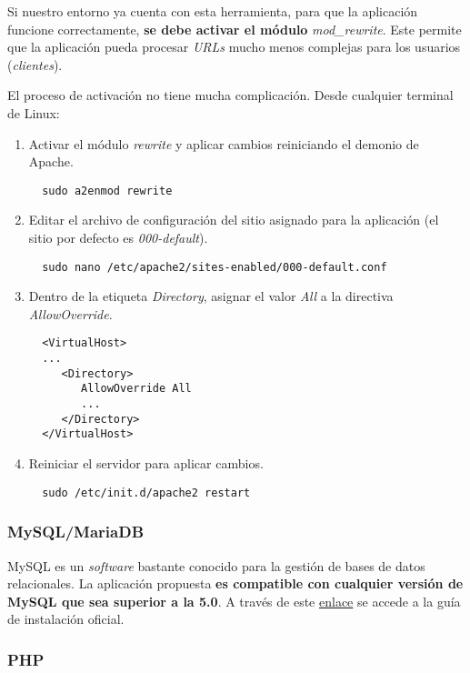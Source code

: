 Si nuestro entorno ya cuenta con esta herramienta, para que la
aplicación funcione correctamente, \textbf{se debe activar el módulo}
\emph{mod\_rewrite}. Este permite que la aplicación pueda procesar
\emph{URLs} mucho menos complejas para los usuarios (\emph{clientes}).

El proceso de activación no tiene mucha complicación. Desde cualquier
terminal de Linux:

\begin{enumerate}
\def\labelenumi{\arabic{enumi}.}
\tightlist
\item
  Activar el módulo \emph{rewrite} y aplicar cambios reiniciando el
  demonio de Apache.
  \begin{verbatim}
  sudo a2enmod rewrite
  \end{verbatim}
\item
  Editar el archivo de configuración del sitio asignado para la
  aplicación (el sitio por defecto es \emph{000-default}).
  \begin{verbatim}
  sudo nano /etc/apache2/sites-enabled/000-default.conf
  \end{verbatim}
\item
  Dentro de la etiqueta \emph{Directory}, asignar el valor \emph{All} a
  la directiva \emph{AllowOverride}.
  \begin{verbatim}
  <VirtualHost>
  ...
     <Directory>
        AllowOverride All
        ...
     </Directory>
  </VirtualHost>
  \end{verbatim}
\item Reiniciar el servidor para aplicar cambios.
  \begin{verbatim}
  sudo /etc/init.d/apache2 restart
  \end{verbatim}  
\end{enumerate}

\subsubsection{MySQL/MariaDB}

MySQL es un \emph{software} bastante conocido para la gestión de bases
de datos relacionales. La aplicación propuesta \textbf{es compatible con
cualquier versión de MySQL que sea superior a la 5.0}. A través de este
\href{https://dev.mysql.com/doc/mysql-installation-excerpt/5.7/en/}{enlace}
se accede a la guía de instalación oficial.

\subsubsection{PHP}

